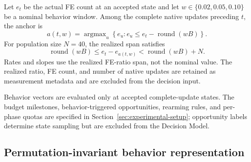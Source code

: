 Let $e_t$ be the actual FE count at an accepted state and let $w\in\{0.02,0.05,0.10\}$ be a nominal behavior window.  Among the complete native updates preceding $t$, the anchor is
\begin{equation}
  a(t,w)=\mathop{\arg\max}_{u}
  \left\{e_u:e_u\le e_t-\operatorname{round}(wB)\right\}.
  \label{eq:native-window-anchor}
\end{equation}
For population size $N=40$, the realized span satisfies
\begin{equation}
  \operatorname{round}(wB)
  \le e_t-e_{a(t,w)}
  <\operatorname{round}(wB)+N.
  \label{eq:native-window-bound}
\end{equation}
Rates and slopes use the realized FE-ratio span, not the nominal value.  The realized ratio, FE count, and number of native updates are retained as measurement metadata and are excluded from the decision input.

Behavior vectors are evaluated only at accepted complete-update states.  The
budget milestones, behavior-triggered opportunities, rearming rules, and
per-phase quotas are specified in Section~\ref{sec:experimental-setup};
opportunity labels determine state sampling but are excluded from the Decision
Model.

\subsection{Permutation-invariant behavior representation}

